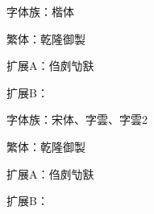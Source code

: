 \documentclass{ltc-guji}
\begin{document}
\begin{正文}

字体族：楷体

繁体：乾隆御製

扩展A：㑇㓟㔕㝬

扩展B：𠀀𡚌𩶊

字体族：宋体、字雲、字雲2

繁体：乾隆御製

扩展A：㑇㓟㔕㝬

扩展B：𠀀𡚌𩶊

\end{正文}
\end{document}
